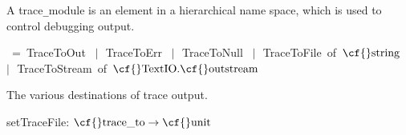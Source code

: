 \begin{descr}
\item {}{} \label{ty-TRACE_CML.trace_module}

\begin{speccomment}
\item 

	A {\cf \small trace{\tt\_}\linebreak[0]module} is an element in a hierarchical 	name space, which is used to control debugging output.     \end{speccomment}
\item {}{} \label{ty-TRACE_CML.trace_to}\begin{minipage}[t]{4in}\raggedright
\mbox{\cf \ = TraceToOut\label{con-TRACE_CML.TraceToOut}}{}
\mbox{\cf \ $|\,$ TraceToErr\label{con-TRACE_CML.TraceToErr}}{}
\mbox{\cf \ $|\,$ TraceToNull\label{con-TRACE_CML.TraceToNull}}{}
\mbox{\cf \ $|\,$ TraceToFile\label{con-TRACE_CML.TraceToFile} of \(\mbox{\cf{}string}\)}{}
\mbox{\cf \ $|\,$ TraceToStream\label{con-TRACE_CML.TraceToStream} of \(\mbox{\cf{}TextIO}.\mbox{\cf{}outstream}\)}{}
\end{minipage}

\begin{speccomment}
\item 

	The various destinations of trace output.     \end{speccomment}
\item {}{} {\cf setTraceFile: \(\mbox{\cf{}trace\_to}\rightarrow \mbox{\cf{}unit}\)}\label{val-TRACE_CML.setTraceFile}



\end{descr}
